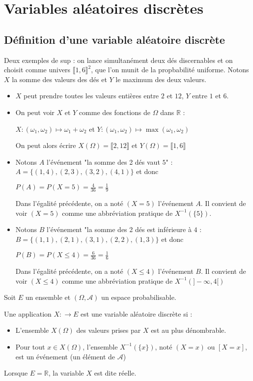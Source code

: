\documentclass[a4paper,12pt]{book}
\newcommand{\Def}[2]{\begin{tcolorbox}[sharp corners, colback=white,colframe=blue!90!black!75, title=Définition : #1]#2\end{tcolorbox}}
\def\R{\mathbb{R}}
\begin{document}
\section{Variables aléatoires discrètes}
\subsection{Définition d'une variable aléatoire discrète}
Deux exemples de sup : on lance simultanément deux dés discernables et on choisit comme univers $\llbracket 1,6\rrbracket^2$, que l'on munit de la propbabilité uniforme. Notons $X$ la somme des valeurs des dés et $Y$ le maximum des deux valeurs.\begin{itemize}
\item $X$ peut prendre toutes les valeurs entières entre $2$ et $12$, $Y$ entre $1$ et $6$.
\item On peut voir $X$ et $Y$ comme des fonctions de $\Omega$ dans $\R$ : \par\begin{center}$X:(\omega_1,\omega_2)\mapsto \omega_1+\omega_2$ et $Y:(\omega_1,\omega_2)\mapsto \max(\omega_1,\omega_2)$\end{center}
\par On peut alors écrire $X(\Omega) = \llbracket 2,12\rrbracket$ et $Y(\Omega)=\llbracket 1,6\rrbracket$
\item Notons $A$ l'événement "la somme des 2 dés vaut $5$" : $A=\{(1,4), (2,3), (3,2), (4,1)\}$ et donc \par\begin{center}$P(A)=P(X=5)=\frac{4}{36}=\frac{1}{9}$\end{center}\par Dans l'égalité précédente, on a noté $(X=5)$ l'événement $A$. Il convient de voir $(X=5)$ comme une abbréviation pratique de $X^{-1}(\{5\})$.
\item Notons $B$ l'événement "la somme des 2 dés est inférieure à $4$ : $B=\{(1,1), (2,1), (3,1), (2,2), (1,3)\}$ et donc \par\begin{center}$P(B)=P(X\leq 4)=\frac{6}{36}=\frac{1}{6}$\end{center} \par Dans l'égalité précédente, on a noté $(X\leq 4)$ l'événement $B$. Il convient de voir $(X\leq 4)$ comme une abbréviation pratique de $X^{-1}(]-\infty, 4[)$
\end{itemize}
\Def{}{Soit $E$ un ensemble et $(\Omega, \mathcal{A})$ un espace probabilisable.
\par Une application $X:\to E$ est une variable aléatoire discrète si :\begin{itemize}
\item L'ensemble $X(\Omega)$ des valeurs prises par $X$ est au plus dénombrable.
\item Pour tout $x\in X(\Omega)$, l'ensemble $X^{-1}(\{x\})$, noté $(X=x)$ ou $[X=x]$, est un événement (un élément de $\mathcal{A}$)
\end{itemize}
Lorsque $E=\R$, la variable $X$ est dite réelle.}
\end{document}
